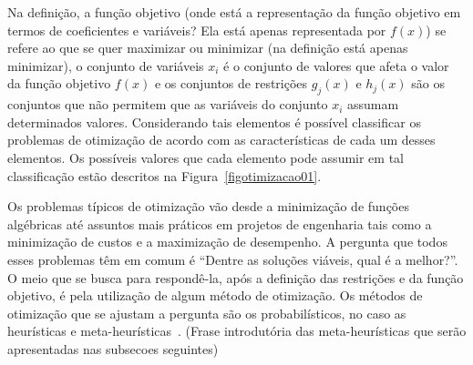 Na definição, a função objetivo (onde está a representação da função objetivo em termos de coeficientes e variáveis? Ela está apenas representada por $f(x)$) se refere ao que se quer maximizar ou minimizar (na definição está apenas minimizar), o conjunto de variáveis $x_i$ é o conjunto de valores que afeta o valor da função objetivo $f(x)$ e os conjuntos de restrições $g_j(x)$ e $h_j(x)$ são os conjuntos que não permitem que as variáveis do conjunto $x_i$ assumam determinados valores. Considerando tais elementos é possível classificar os problemas de otimização de acordo com as características de cada um desses elementos. Os possíveis valores que cada elemento pode assumir em tal classificação estão descritos na Figura~\ref{figotimizacao01}.

Os problemas típicos de otimização vão desde a minimização de funções algébricas
até assuntos mais práticos em projetos de engenharia tais como a minimização de
custos e a maximização de desempenho. A pergunta que todos esses problemas têm
em comum é ``Dentre as soluções viáveis, qual é a melhor?''. O meio que se busca
para respondê-la, após a definição das restrições e da função objetivo, é pela
utilização de algum método de otimização. Os métodos de otimização que se
ajustam a pergunta são os probabilísticos, no caso as heurísticas e
meta-heurísticas~\cite{gandomi2013metaheuristic}. (Frase introdutória das
meta-heurísticas que serão apresentadas nas subsecoes seguintes)

